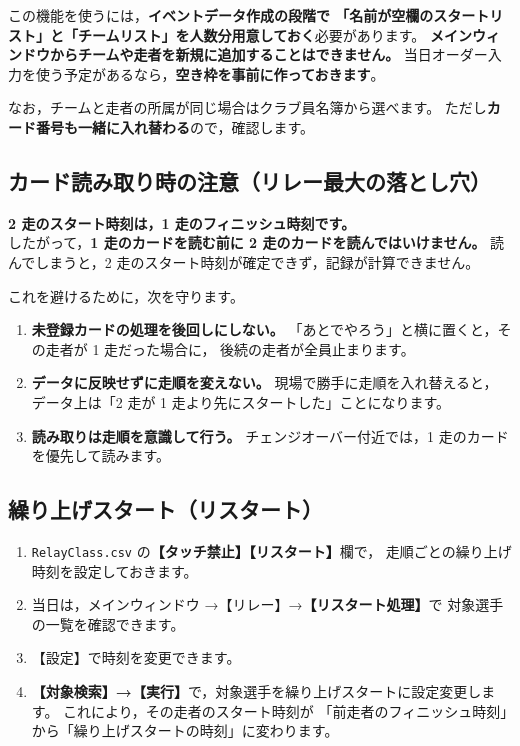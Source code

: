 \begin{Note}[当日オーダー入力を使うための準備]
この機能を使うには，\textbf{イベントデータ作成の段階で
「名前が空欄のスタートリスト」と「チームリスト」を人数分用意しておく}必要があります。
\textbf{メインウィンドウからチームや走者を新規に追加することはできません。}
当日オーダー入力を使う予定があるなら，\textbf{空き枠を事前に作っておきます}。

なお，チームと走者の所属が同じ場合はクラブ員名簿から選べます。
ただし\textbf{カード番号も一緒に入れ替わる}ので，確認します。
\end{Note}

\subsection*{カード読み取り時の注意（リレー最大の落とし穴）}

\begin{Fail}
\textbf{2 走のスタート時刻は，1 走のフィニッシュ時刻です。}\\
したがって，\textbf{1 走のカードを読む前に 2 走のカードを読んではいけません。}
読んでしまうと，2 走のスタート時刻が確定できず，記録が計算できません。
\end{Fail}

これを避けるために，次を守ります。

\begin{enumerate}
\item \textbf{未登録カードの処理を後回しにしない。}
      「あとでやろう」と横に置くと，その走者が 1 走だった場合に，
      後続の走者が全員止まります。
\item \textbf{データに反映せずに走順を変えない。}
      現場で勝手に走順を入れ替えると，
      データ上は「2 走が 1 走より先にスタートした」ことになります。
\item \textbf{読み取りは走順を意識して行う。}
      チェンジオーバー付近では，1 走のカードを優先して読みます。
\end{enumerate}

\subsection*{繰り上げスタート（リスタート）}

\begin{enumerate}
\item \texttt{RelayClass.csv} の\textbf{【タッチ禁止】【リスタート】}欄で，
      走順ごとの繰り上げ時刻を設定しておきます。
\item 当日は，メインウィンドウ →【リレー】→\textbf{【リスタート処理】}で
      対象選手の一覧を確認できます。\ver
\item 【設定】で時刻を変更できます。
\item \textbf{【対象検索】→【実行】}で，対象選手を繰り上げスタートに設定変更します。
      これにより，その走者のスタート時刻が
      「前走者のフィニッシュ時刻」から「繰り上げスタートの時刻」に変わります。
\end{enumerate}

